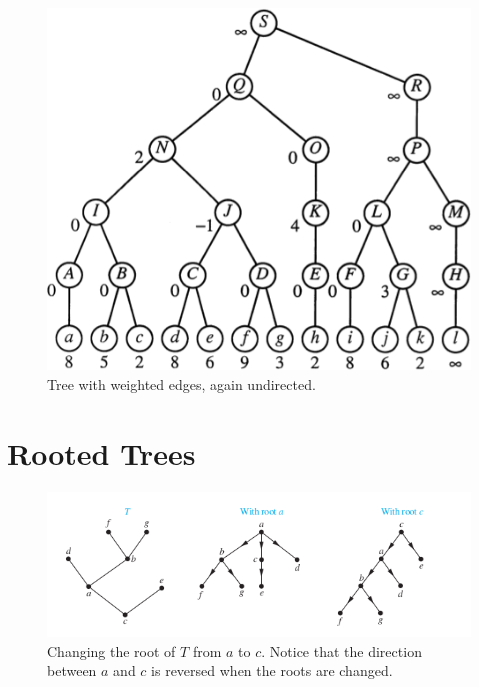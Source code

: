 \documentclass[a4paper,10pt]{article}
\begin{document}
\begin{figure}[H]
	\begin{centering}
	\begin{center}
	\includegraphics[width=\linewidth]{./topology-tree.png}
	\caption{Tree with weighted edges, again undirected.}
	\label{fig:toplogy}
	\end{center}
	\par\end{centering}
\end{figure}

\section{Rooted Trees}

\begin{figure}[h!]
	\begin{centering}
	\begin{center}
	\includegraphics[width=\linewidth]{./changing_roots.png}
	\caption{Changing the root of $T$ from $a$ to $c$. Notice that the direction between $a$ and $c$ is reversed when the roots are changed.}
	\label{fig:changing_roots}
	\end{center}
	\par\end{centering}
\end{figure}
\end{document}
